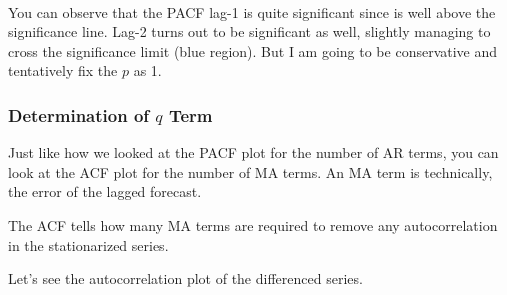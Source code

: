 \documentclass[11pt]{article}
\begin{document}
    \begin{center}
    \end{center}
    { \hspace*{\fill} \\}
    
    You can observe that the PACF lag-1 is quite significant since is well
above the significance line. Lag-2 turns out to be significant as well,
slightly managing to cross the significance limit (blue region). But I
am going to be conservative and tentatively fix the \(p\) as 1.

\hypertarget{determination-of-q-term}{%
\subsubsection{\texorpdfstring{Determination of \(q\)
Term}{Determination of q Term}}\label{determination-of-q-term}}

Just like how we looked at the PACF plot for the number of AR terms, you
can look at the ACF plot for the number of MA terms. An MA term is
technically, the error of the lagged forecast.

The ACF tells how many MA terms are required to remove any
autocorrelation in the stationarized series.

Let's see the autocorrelation plot of the differenced series.
\end{document}
